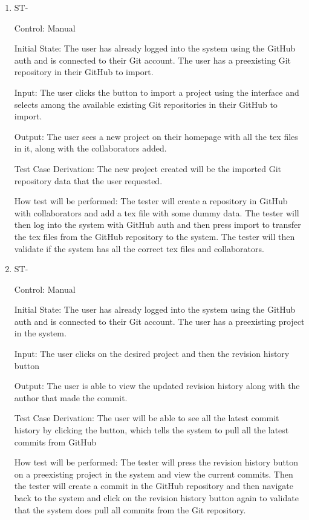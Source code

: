 \documentclass[12pt, titlepage]{article}
\newcounter{TESTID}
\newcommand\TESTNUM{\stepcounter{TESTID}\theTESTID}
\begin{document}
\begin{enumerate}
		\item{ST-\TESTNUM\\}
		
		Control: Manual
		
		Initial State: The user has already logged into the system using the GitHub auth and is connected to their Git account. The user has a preexisting Git repository in their GitHub to import.
		
		Input: The user clicks the button to import a project using the interface and selects among the available existing Git repositories in their GitHub to import. 
		
		Output: The user sees a new project on their homepage with all the tex files in it, along with the collaborators added.
		
		Test Case Derivation: The new project created will be the imported Git repository data that the user requested.
		
		How test will be performed: The tester will create a repository in GitHub with collaborators and add a tex file with some dummy data. The tester will then log into the system with GitHub auth and then press import to transfer the tex files from the GitHub repository to the system. The tester will then validate if the system has all the correct tex files and collaborators.
		
		\item{ST-\TESTNUM\\}
		
		Control: Manual
		
		Initial State: The user has already logged into the system using the GitHub auth and is connected to their Git account. The user has a preexisting project in the system.
		
		Input: The user clicks on the desired project and then the revision history button
		
		Output: The user is able to view the updated revision history along with the author that made the commit.
		
		Test Case Derivation: The user will be able to see all the latest commit history by clicking the button, which tells the system to pull all the latest commits from GitHub 
		
		How test will be performed: The tester will press the revision history button on a preexisting project in the system and view the current commits. Then the tester will create a commit in the GitHub repository and then navigate back to the system and click on the revision history button again to validate that the system does pull all commits from the Git repository.
		

\end{enumerate}
\end{document}
